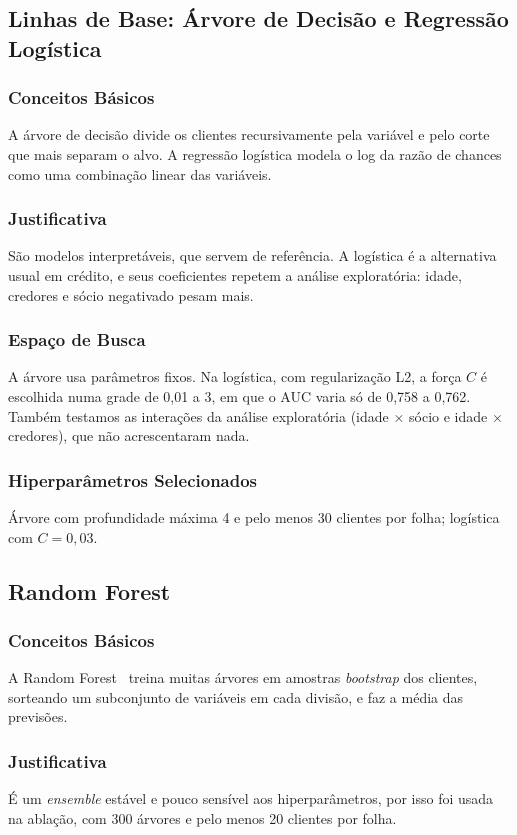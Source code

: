 \documentclass[conference]{IEEEtran}
\begin{document}
\subsection{Linhas de Base: Árvore de Decisão e Regressão Logística}
\subsubsection{Conceitos Básicos}
A árvore de decisão divide os clientes recursivamente pela variável e pelo corte que mais separam o alvo. A regressão logística modela o log da razão de chances como uma combinação linear das variáveis.
\subsubsection{Justificativa}
São modelos interpretáveis, que servem de referência. A logística é a alternativa usual em crédito, e seus coeficientes repetem a análise exploratória: idade, credores e sócio negativado pesam mais.
\subsubsection{Espaço de Busca}
A árvore usa parâmetros fixos. Na logística, com regularização L2, a força $C$ é escolhida numa grade de 0,01 a 3, em que o AUC varia só de 0,758 a 0,762. Também testamos as interações da análise exploratória (idade $\times$ sócio e idade $\times$ credores), que não acrescentaram nada.
\subsubsection{Hiperparâmetros Selecionados}
Árvore com profundidade máxima 4 e pelo menos 30 clientes por folha; logística com $C = 0{,}03$.

\subsection{Random Forest}
\subsubsection{Conceitos Básicos}
A Random Forest~\cite{breiman2001} treina muitas árvores em amostras \textit{bootstrap} dos clientes, sorteando um subconjunto de variáveis em cada divisão, e faz a média das previsões.
\subsubsection{Justificativa}
É um \textit{ensemble} estável e pouco sensível aos hiperparâmetros, por isso foi usada na ablação, com 300 árvores e pelo menos 20 clientes por folha.
\end{document}
